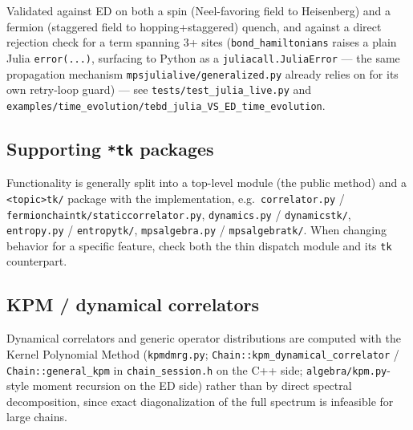\documentclass[11pt]{article}
\begin{document}
Validated against ED on both a spin (Neel-favoring field to Heisenberg)
and a fermion (staggered field to hopping+staggered) quench, and against
a direct rejection check for a term spanning 3+ sites
(\lstinline|bond_hamiltonians| raises a plain Julia \lstinline|error(...)|,
surfacing to Python as a \lstinline|juliacall.JuliaError| --- the same
propagation mechanism \texttt{mpsjulialive/generalized.py} already relies
on for its own retry-loop guard) --- see \texttt{tests/test\_julia\_live.py}
and
\texttt{examples/time\_evolution/tebd\_julia\_VS\_ED\_time\_evolution}.

\subsection{Supporting \texttt{*tk} packages}

Functionality is generally split into a top-level module (the public
method) and a \texttt{<topic>tk/} package with the implementation, e.g.\
\texttt{correlator.py} / \texttt{fermionchaintk/staticcorrelator.py},
\texttt{dynamics.py} / \texttt{dynamicstk/}, \texttt{entropy.py} /
\texttt{entropytk/}, \texttt{mpsalgebra.py} / \texttt{mpsalgebratk/}.
When changing behavior for a specific feature, check both the thin
dispatch module and its \texttt{tk} counterpart.

\subsection{KPM / dynamical correlators}

Dynamical correlators and generic operator distributions are computed
with the Kernel Polynomial Method (\texttt{kpmdmrg.py};
\texttt{Chain::kpm\_dynamical\_correlator} / \texttt{Chain::general\_kpm}
in \texttt{chain\_session.h} on the C++ side;
\texttt{algebra/kpm.py}-style moment recursion on the ED side)
rather than by direct spectral decomposition, since exact
diagonalization of the full spectrum is infeasible for large chains.
\end{document}
